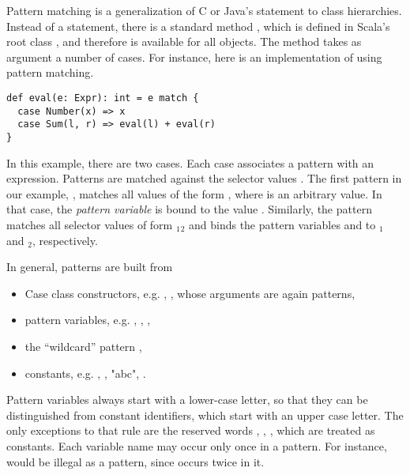 \documentclass[a4paper,12pt,twoside,titlepage]{book}
\begin{document}
Pattern matching is a generalization of C or Java's 
statement to class hierarchies. Instead of a  statement,
there is a standard method , which is defined in Scala's
root class , and therefore is available for all objects.
The  method takes as argument a number of cases. 
For instance, here is an implementation of  using 
pattern matching.
\begin{lstlisting}
def eval(e: Expr): int = e match { 
  case Number(x) => x 
  case Sum(l, r) => eval(l) + eval(r) 
}
\end{lstlisting}
In this example, there are two cases. Each case associates a pattern
with an expression. Patterns are matched against the selector
values .  The first pattern in our example,
, matches all values of the form , 
where  is an arbitrary value.  In that case, the {\em pattern
variable}  is bound to the value . Similarly, the
pattern  matches all selector values of form
$_1$$_2$\code{)} and binds the pattern variables
 and  
to $_1$ and $_2$, respectively. 

In general, patterns are built from
\begin{itemize}
\item Case class constructors, e.g. , , whose arguments
      are again patterns,
\item pattern variables, e.g. , , ,
\item the ``wildcard'' pattern \code{_},
\item constants, e.g. , , "abc", .
\end{itemize}
Pattern variables always start with a lower-case letter, so that they
can be distinguished from constant identifiers, which start with an
upper case letter. The only exceptions to that rule are the reserved
words , , , which are treated as constants.
Each variable name may occur only once in a pattern. For instance,
 would be illegal as a pattern, since  occurs
twice in it.
\end{document}
